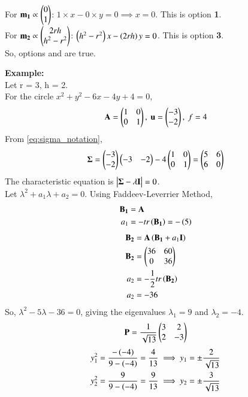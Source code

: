 \documentclass[journal]{IEEEtran}
\begin{document}
For $\mathbf{m_1} \propto \begin{pmatrix}0 \\ 1\end{pmatrix}$: $1 \times x - 0 \times y = 0 \implies x = 0$. This is option \textbf{1}. \\
For $\mathbf{m_2} \propto \begin{pmatrix}2rh \\ h^2-r^2\end{pmatrix}$: $\left(h^2-r^2\right)x - \left(2rh\right)y = 0$. This is option \textbf{3}. \\
So, options \textbf{} and \textbf{} are true.

\textbf{Example:}\\
Let r = 3, h = 2. \\
For the circle $x^2+y^2-6x-4y+4=0$,
\begin{align}
    \mathbf{A} = \begin{pmatrix}1 & 0 \\ 0 & 1\end{pmatrix},\text{ }\mathbf{u} = \begin{pmatrix}-3 \\ -2\end{pmatrix},\text{ }f = 4
\end{align}
From \eqref{eq:sigma_notation},
\begin{align}
    \mathbf{\Sigma} = \begin{pmatrix}-3 \\ -2\end{pmatrix}\begin{pmatrix}-3 & -2\end{pmatrix} - 4\begin{pmatrix}1 & 0 \\ 0 & 1\end{pmatrix} = \begin{pmatrix}5 & 6 \\ 6 & 0\end{pmatrix}
\end{align}
The characteristic equation is $\begin{vmatrix}\mathbf{\Sigma}-\lambda\mathbf{I}\end{vmatrix}=0$. \\
Let $\lambda^2 + a_1 \lambda + a_2 = 0$. Using Faddeev-Leverrier Method,
\begin{align}
    \mathbf{B_1} &= \mathbf{A} \\
    a_1 &= - tr\left(\mathbf{B_1}\right) = -\left(5\right)
\end{align}
\begin{align}
    \mathbf{B_2} &= \mathbf{A}\left(\mathbf{B_1} + a_1\mathbf{I}\right) \\
    \mathbf{B_2} &= \begin{pmatrix}36 & 60 \\ 0 & 36\end{pmatrix} \\
    a_2 &= -\frac{1}{2}tr\left(\mathbf{B_2}\right) \\
    a_2 &= -36
\end{align}
So, $\lambda^2 - 5\lambda - 36 = 0$, giving the eigenvalues $\lambda_1 = 9$ and $\lambda_2 = -4$.
\begin{align}
    \mathbf{P} = \frac{1}{\sqrt{13}}\begin{pmatrix}3 & 2 \\ 2 & -3\end{pmatrix}
\end{align}
\begin{align}
    y_1^2 = \frac{-\left(-4\right)}{9-\left(-4\right)} = \frac{4}{13} \implies y_1 = \pm\frac{2}{\sqrt{13}} \\
    y_2^2 = \frac{9}{9-\left(-4\right)} = \frac{9}{13} \implies y_2 = \pm\frac{3}{\sqrt{13}}
\end{align}
\end{document}
